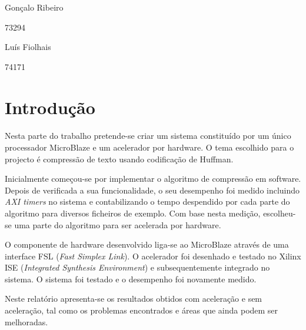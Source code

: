 \documentclass[a4paper]{article}
\begin{document}



	\trSetAuthors
		{
		\begin{center}
		Gonçalo Ribeiro

		73294
		\end{center}
		}{
		\begin{center}
		Luís Fiolhais

		74171
		\end{center}
		}


	\trMakeCover

	\tableofcontents

  \pagebreak

  \setcounter{page}{1}


	\section{Introdução}

	\paragraph{} Nesta parte do trabalho pretende-se criar um sistema constituído por um único processador MicroBlaze e um acelerador por hardware. O tema escolhido para o projecto é compressão de texto usando codificação de Huffman.

	Inicialmente começou-se por implementar o algoritmo de compressão em software. Depois de verificada a sua funcionalidade, o seu desempenho foi medido incluindo \textit{AXI timers} no sistema e contabilizando o tempo despendido por cada parte do algoritmo para diversos ficheiros de exemplo. Com base nesta medição, escolheu-se uma parte do algoritmo para ser acelerada por hardware.

	O componente de hardware desenvolvido liga-se ao MicroBlaze através de uma interface FSL (\textit{Fast Simplex Link}). O acelerador foi desenhado e testado no Xilinx ISE (\textit{Integrated Synthesis Environment}) e subsequentemente integrado no sistema. O sistema foi testado e o desempenho foi novamente medido.

  Neste relatório apresenta-se os resultados obtidos com aceleração e sem aceleração, tal como os problemas encontrados e áreas que ainda podem ser melhoradas.
\end{document}

